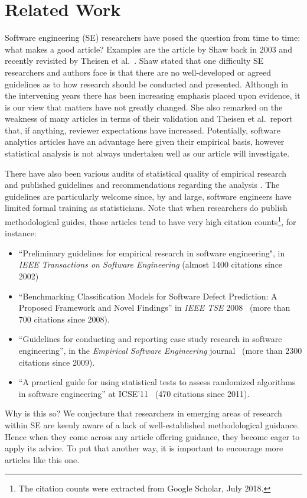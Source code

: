 \documentclass[preprint,10pt]{elsarticle}
\newcommand{\bi}{\begin{itemize}}
\newcommand{\ei}{\end{itemize}}
\begin{document}
\section{Related Work}\label{Sec:RelWk}
 
Software engineering (SE) researchers have posed the question from time to time: what makes a good article?  Examples are the article by Shaw \cite{Shaw03} back in 2003 and recently revisited by Theisen et al.~\cite{Thei17}.  Shaw stated that one difficulty SE researchers and authors face is that there are no well-developed or agreed guidelines as to how research should be conducted and presented.  Although in the intervening years there has been increasing emphasis placed upon evidence, it is our view that matters have not greatly changed.  She also remarked on the weakness of many articles in terms of their validation and Theisen et al.\ report that, if anything, reviewer expectations have increased.  Potentially, software analytics articles have an advantage here given their empirical basis, however statistical analysis is not always undertaken well as our article will investigate.

There have also been various audits of statistical quality of empirical research \cite{Kitc02} and published guidelines and recommendations regarding the analysis \cite{Kitc02,Wohl12}. The guidelines are particularly welcome since, by and large, software engineers have limited formal training as statisticians.  Note that when researchers do publish methodological guides, those articles tend to have very high citation counts\footnote{The citation counts were extracted from Google Scholar, July 2018.}, for instance:
\bi
\item ``Preliminary guidelines for empirical research in software engineering", in \textit{IEEE Transactions on Software Engineering} \cite{Kitc02} (almost 1400 citations since 2002)
\item ``Benchmarking Classification Models for Software Defect Prediction: A Proposed Framework and Novel Findings'' in \textit{IEEE TSE} 2008~\cite{Lessmann08} (more than 700 citations since 2008).
\item
``Guidelines for conducting and reporting case study research in software engineering'', 
  in the \textit{Empirical Software Engineering} journal~\cite{runeson2009guidelines} (more than 2300 citations since 2009).
\item ``A practical guide for using statistical tests to assess randomized algorithms in software engineering'' at ICSE'11~\cite{Arcuri:2011} (470 citations since 2011).
\ei
Why is this so?  We conjecture that researchers in emerging areas of research within SE are keenly aware of a lack of well-established methodological guidance. Hence when they come across any article offering  guidance, they become eager to apply its advice.  To put that another way, it is important to encourage more articles like this one.
\end{document}
